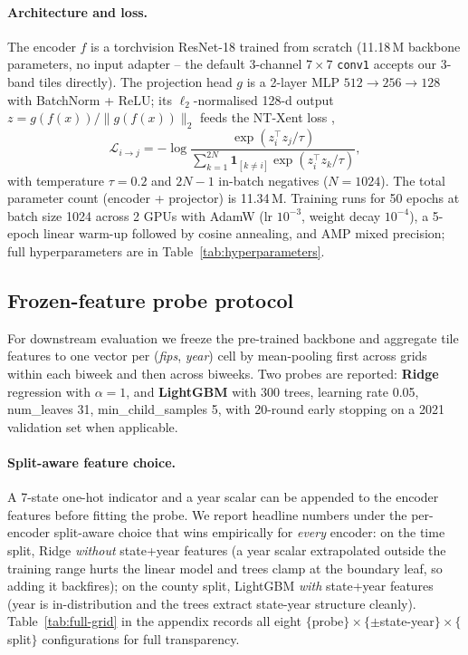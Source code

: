 \documentclass{article}
\begin{document}
\paragraph{Architecture and loss.}
The encoder $f$ is a torchvision ResNet-18 trained from scratch (11.18\,M
backbone parameters, no input adapter -- the default 3-channel
$7\times 7$ \texttt{conv1} accepts our 3-band tiles directly). The projection
head $g$ is a 2-layer MLP $512 \to 256 \to 128$ with BatchNorm + ReLU; its
$\ell_2$-normalised 128-d output $z = g(f(x)) / \|g(f(x))\|_2$ feeds the
NT-Xent loss \citep{chen2020simclr},
\begin{equation}
\label{eq:ntxent}
\mathcal{L}_{i \to j} = -\log
  \frac{\exp(z_i^\top z_j / \tau)}{\sum_{k=1}^{2N} \mathbf{1}_{[k\neq i]} \exp(z_i^\top z_k / \tau)},
\end{equation}
with temperature $\tau = 0.2$ and $2N-1$ in-batch negatives ($N=1024$).
The total parameter count (encoder + projector) is 11.34\,M. Training runs
for 50 epochs at batch size 1024 across 2 GPUs with AdamW
(lr $10^{-3}$, weight decay $10^{-4}$), a 5-epoch linear warm-up followed by
cosine annealing, and AMP mixed precision; full hyperparameters are in
Table~\ref{tab:hyperparameters}.

\subsection{Frozen-feature probe protocol}
\label{sec:methods-probe}
For downstream evaluation we freeze the pre-trained backbone and aggregate
tile features to one vector per (\textit{fips}, \textit{year}) cell by
mean-pooling first across grids within each biweek and then across biweeks.
Two probes are reported: \textbf{Ridge} regression with $\alpha=1$, and \textbf{LightGBM} \citep{ke2017lightgbm} with 300 trees,
learning rate 0.05, num\_leaves 31, min\_child\_samples 5, with 20-round early
stopping on a 2021 validation set when applicable.

\paragraph{Split-aware feature choice.}
A 7-state one-hot indicator and a year scalar can be appended to the encoder
features before fitting the probe. We report headline numbers under the
per-encoder split-aware choice that wins empirically for \emph{every} encoder:
on the time split, Ridge \emph{without} state+year features (a year scalar
extrapolated outside the training range hurts the linear model and trees clamp
at the boundary leaf, so adding it backfires); on the county split, LightGBM
\emph{with} state+year features (year is in-distribution and the trees extract
state-year structure cleanly). Table~\ref{tab:full-grid} in the appendix
records all eight $\{$probe$\} \times \{\pm$state-year$\} \times \{$split$\}$
configurations for full transparency.
\end{document}
